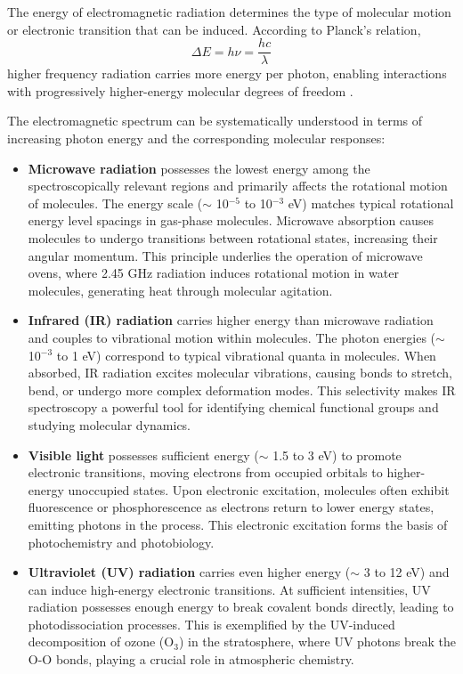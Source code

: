 \noindent The energy of electromagnetic radiation determines the type of molecular motion or electronic transition that can be induced. According to Planck's relation,
\begin{equation}
	\Delta E = h\nu = \frac{hc}{\lambda}
	\label{eq:planck_energy_frequency}
\end{equation}
higher frequency radiation carries more energy per photon, enabling interactions with progressively higher-energy molecular degrees of freedom \cite{boyd2008chapter1nonlinear, mukamel1995principlesnonlinearoptical}.

\noindent The electromagnetic spectrum can be systematically understood in terms of increasing photon energy and the corresponding molecular responses:

\begin{itemize}
	\item \textbf{Microwave radiation} possesses the lowest energy among the spectroscopically relevant regions and primarily affects the rotational motion of molecules. The energy scale ($\sim$ 10$^{-5}$ to 10$^{-3}$ eV) matches typical rotational energy level spacings in gas-phase molecules. Microwave absorption causes molecules to undergo transitions between rotational states, increasing their angular momentum. This principle underlies the operation of microwave ovens, where 2.45 GHz radiation induces rotational motion in water molecules, generating heat through molecular agitation.

	\item \textbf{Infrared (IR) radiation} carries higher energy than microwave radiation and couples to vibrational motion within molecules. The photon energies ($\sim$ 10$^{-3}$ to 1 eV) correspond to typical vibrational quanta in molecules. When absorbed, IR radiation excites molecular vibrations, causing bonds to stretch, bend, or undergo more complex deformation modes. This selectivity makes IR spectroscopy a powerful tool for identifying chemical functional groups and studying molecular dynamics.

	\item \textbf{Visible light} possesses sufficient energy ($\sim$ 1.5 to 3 eV) to promote electronic transitions, moving electrons from occupied orbitals to higher-energy unoccupied states. Upon electronic excitation, molecules often exhibit fluorescence or phosphorescence as electrons return to lower energy states, emitting photons in the process. This electronic excitation forms the basis of photochemistry and photobiology.

	\item \textbf{Ultraviolet (UV) radiation} carries even higher energy ($\sim$ 3 to 12 eV) and can induce high-energy electronic transitions. At sufficient intensities, UV radiation possesses enough energy to break covalent bonds directly, leading to photodissociation processes. This is exemplified by the UV-induced decomposition of ozone (O$_3$) in the stratosphere, where UV photons break the O-O bonds, playing a crucial role in atmospheric chemistry.
\end{itemize}


